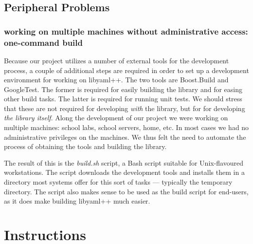 \documentclass{article}
\begin{document}
\subsection{Peripheral Problems}


\subsubsection{working on multiple machines without administrative access:
one-command build}
Because our project utilizes a number of external tools for the development 
process, a couple of additional steps are required in order to set up a 
development environment for working on libyaml++.  The two tools are 
Boost.Build and GoogleTest.  The former is required for easily building the 
library and for easing other build tasks.  The latter is required for running 
unit tests.  We should stress that these are not required for developing 
\emph{with} the library, but for for developing \emph{the library itself}.  
Along the development of our project we were working on multiple machines:  
school labs, school servers, home, etc.  In most cases we had no administrative 
privileges on the machines.  We thus felt the need to automate the process of 
obtaining the tools and building the library.

The result of this is the \textit{build.sh} script, a Bash script suitable for 
Unix-flavoured workstations.  The script downloads the development tools and 
installs them in a directory most systems offer for this sort of tasks --- 
typically the temporary directory.  The script also makes sense to be used as 
the build script for end-users, as it does make building libyaml++ much easier.



\section{Instructions}
\end{document}

